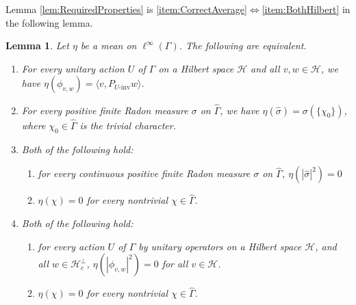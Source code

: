 \documentclass[12pt]{amsart} \usepackage{amsmath,centernot,amssymb,leftindex}
\newtheorem{lemma}[theorem]{Lemma}
\numberwithin{theorem}{section}
\numberwithin{equation}{section}
\theoremstyle{definition}
\begin{document}
Lemma \ref{lem:RequiredProperties} is  \ref{item:CorrectAverage}$\iff$\ref{item:BothHilbert} in the following lemma.
\begin{lemma}\label{lem:FSequivalents}
	Let $\eta$ be a mean on $\ell^{\infty}(\Gamma)$.  The following are equivalent.
	
	\begin{enumerate}
		\item\label{item:CorrectAverage} For every unitary action $U$ of $\Gamma$ on a Hilbert space $\mathcal H$ and all $v, w\in \mathcal H$, we have $\eta(\phi_{v,w})=\langle v, P_{U\text{-inv}} w\rangle$.
		\item\label{item:AtomAt0} For every  positive finite Radon measure $\sigma$ on $\widehat{\Gamma}$, we have $\eta(\hat{\sigma})=\sigma(\{\chi_{0}\})$, where $\chi_{0}\in\widehat{\Gamma}$ is the trivial character.
		
		\item\label{item:StandardFS} Both of the following hold: 
		\begin{enumerate}
			\item for every continuous positive finite Radon measure $\sigma$ on $\widehat{\Gamma}$, $\eta(|\hat{\sigma}|^{2})=0$
			
			\item  $\eta(\chi)=0$ for every nontrivial $\chi\in\widehat{\Gamma}$.
		\end{enumerate}
		\item\label{item:BothHilbert} Both of the following hold: 
		
		\begin{enumerate}
			\item for every action $U$ of $\Gamma$ by unitary operators on a Hilbert space $\mathcal H$, and all $w\in \mathcal H_{c}^{\perp}$,  $\eta(|\phi_{v,w}|^{2})=0$ for all $v\in \mathcal H$.
			\item\label{eq:BothHilbertDiscrete}  $\eta(\chi)=0$ for every nontrivial $\chi \in \widehat{\Gamma}$.
		\end{enumerate}
	\end{enumerate}
\end{lemma}
\end{document}
